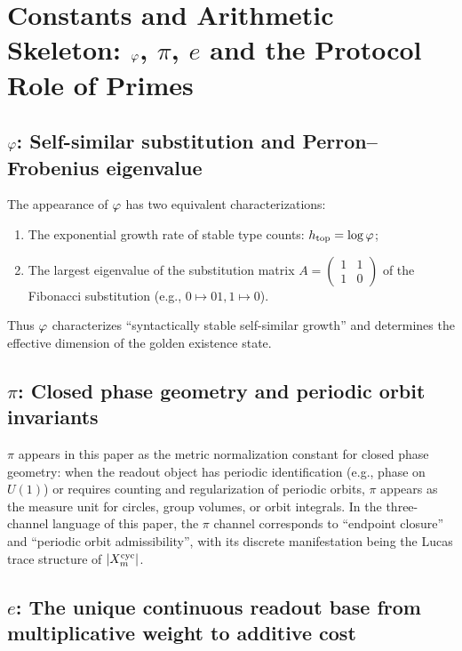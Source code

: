 \section{Constants and Arithmetic Skeleton: \texorpdfstring{$\varphi$, $\pi$, $e$}{phi, pi, e} and the Protocol Role of Primes}

\subsection{\texorpdfstring{$\varphi$}{phi}: Self-similar substitution and Perron--Frobenius eigenvalue}

The appearance of $\varphi$ has two equivalent characterizations:
\begin{enumerate}
  \item The exponential growth rate of stable type counts: $h_{\mathrm{top}}=\log\varphi$;
  \item The largest eigenvalue of the substitution matrix $A=\begin{pmatrix}1&1\\1&0\end{pmatrix}$ of the Fibonacci substitution (e.g., $0\mapsto 01,1\mapsto 0$).
\end{enumerate}
Thus $\varphi$ characterizes ``syntactically stable self-similar growth'' and determines the effective dimension of the golden existence state.

\subsection{\texorpdfstring{$\pi$}{pi}: Closed phase geometry and periodic orbit invariants}

$\pi$ appears in this paper as the metric normalization constant for closed phase geometry: when the readout object has periodic identification (e.g., phase on $U(1)$) or requires counting and regularization of periodic orbits, $\pi$ appears as the measure unit for circles, group volumes, or orbit integrals.
In the three-channel language of this paper, the $\pi$ channel corresponds to ``endpoint closure'' and ``periodic orbit admissibility'', with its discrete manifestation being the Lucas trace structure of $\left\lvert X_m^{\mathrm{cyc}}\right\rvert$.

\subsection{\texorpdfstring{$e$}{e}: The unique continuous readout base from multiplicative weight to additive cost}

